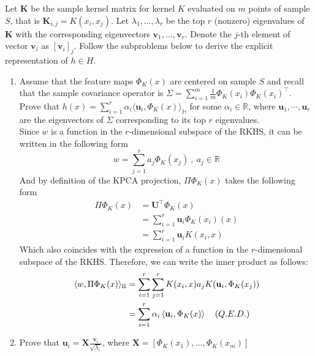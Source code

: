 \documentclass{article}
\def\Rset{\mathbb{R}}
\begin{document}
Let $\mathbf{K}$ be the sample kernel matrix for kernel $K$ evaluated on $m$ points of sample $S$, that is $\mathbf{K}_{i,j} = K(x_{i},x_{j})$. Let $\lambda_{1}, \dots, \lambda_{r}$ be the top $r$ (nonzero) eigenvalues of $\mathbf{K}$ with the corresponding eigenvectors $\mathbf{v}_{1}, \dots, \mathbf{v}_{r}$. Denote the $j$-th element of vector $\mathbf{v}_{i}$ as $[\mathbf{v}_{i}]_{j}$. Follow the subproblems below to derive the explicit representation of $h \in H$.
\begin{enumerate}

\item Assume that the feature maps $\Phi_{K}(x)$ are centered on sample $S$ and recall that the sample covariance operator is $\Sigma = \sum_{i=1}^{m}\frac{1}{m}\Phi_{K}(x_{i})\Phi_{K}(x_{i})^{\top}$. Prove that $h(x) = \sum_{i=1}^{r} \alpha_{i} \langle \mathbf{u}_i , \Phi_{K}(x)\rangle_{\mathbb{H}}$ for some $\alpha_{i} \in \Rset$, where $\mathbf{u}_{1},\cdots, \mathbf{u}_{r}$ are the eigenvectors of $\Sigma$ corresponding to its top $r$ eigenvalues.\\

Since $w$ is a function in the $r$-dimensional subspace of the RKHS, it can be written in the following form
\begin{equation*}
    w = \sum_{j=1}^ra_j\Phi_{K}(x_j)\:,\: a_j \in \Rset
\end{equation*}
And by definition of the KPCA projection, $\Pi \Phi_{K}(x)$ takes the following form
\begin{align*}
    \Pi \Phi_{K}(x) &= \mathbf{U}^{\top}\Phi_{K}(x) \\
    &= \sum_{i=1}^r\mathbf{u}_i\Phi_{K}(x_i)(x)\\
    &= \sum_{i=1}^r\mathbf{u}_iK(x_i,x)
\end{align*}
Which also coincides with the expression of a function in the $r$-dimensional subspace of the RKHS. Therefore, we can write the inner product as follows:
\begin{align*}
    \langle w , \Pi \Phi_{K}(x)\rangle_{\mathbb{H}} &= \sum_{i=1}^r\sum_{j=1}^rK(x_i,x)a_jK(\mathbf{u}_i,\Phi_{K}(x_j))\\
    &= \sum_{i=1}^r\alpha_i\left\langle\mathbf{u}_i,\Phi_{K}(x)\right\rangle \textit \quad {(Q.E.D.)}
\end{align*}

\item Prove that $\mathbf{u}_i = \mathbf{X}\frac{\mathbf{v}_{i}}{\sqrt{\lambda_{i}}}$, where $\mathbf{X} = [\Phi_{K}(x_{1}),\dots,\Phi_{K}(x_{m})]$


\end{enumerate}
\end{document}
